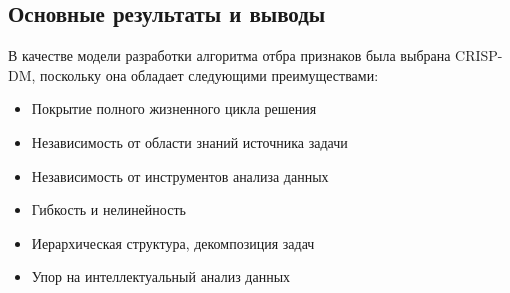 \subsection{Основные результаты и выводы}
В качестве модели разработки алгоритма отбра признаков была выбрана CRISP-DM, поскольку она обладает следующими преимуществами:
\begin{itemize}
	\item Покрытие полного жизненного цикла решения
	\item Независимость от области знаний источника задачи
	\item Независимость от инструментов анализа данных
	\item Гибкость и нелинейность
	\item Иерархическая структура, декомпозиция задач
	\item Упор на интеллектуальный анализ данных
\end{itemize}